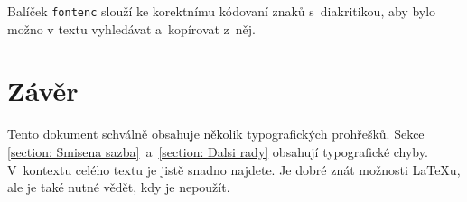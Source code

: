 \documentclass[10pt, a4paper, twocolumn]{article}
\begin{document}
Balíček {\texttt{fontenc}} slouží ke korektnímu kódovaní znaků s~diakritikou, aby bylo možno v textu vyhledávat a~kopírovat z~něj.

\section{Závěr}

Tento dokument schválně obsahuje několik typografických prohřešků.
Sekce \ref{section: Smisena sazba}~a~\ref{section: Dalsi rady} obsahují typografické chyby.
V~kontextu celého textu je jistě snadno najdete.
Je dobré znát možnosti \LaTeX u, ale je také nutné vědět, kdy je nepoužít.
\end{document}
